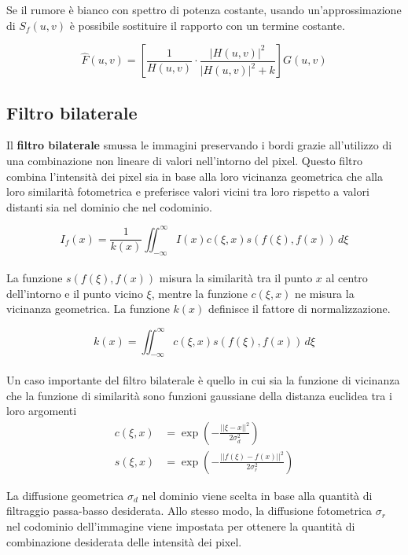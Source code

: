\documentclass[../main.tex]{subfiles}
\begin{document}
	Se il rumore è bianco con spettro di potenza costante, usando un'approssimazione di $S_f(u,v)$ è possibile sostituire il rapporto con un termine costante.
	
	\begin{equation}
		\hat{F}(u,v)= \left[\frac{1}{H(u,v)} \cdot \frac{\left|H(u,v)\right|^2}{\left|H(u,v)\right|^2+k}\right] G(u,v)
	\end{equation}
	
	\subsection{Filtro bilaterale}
	
	Il \textbf{filtro bilaterale} smussa le immagini preservando i bordi grazie all'utilizzo di una combinazione non lineare di valori nell'intorno del pixel. Questo filtro combina l'intensità dei pixel sia in base alla loro vicinanza geometrica che alla loro similarità fotometrica e preferisce valori vicini tra loro rispetto a valori distanti sia nel dominio che nel codominio\cite{tomasi_1998}.
	
	\begin{equation}
		I_f(x) = \frac{1}{k(x)}\iint_{-\infty}^{\infty}I(x)c(\xi,x)s(f(\xi),f(x))\,d\xi
	\end{equation}
	\\[-10pt]
	La funzione $s(f(\xi),f(x))$ misura la similarità tra il punto $x$ al centro dell'intorno e il punto vicino $\xi$, mentre la funzione $c(\xi,x)$ ne misura la vicinanza geometrica. La funzione $k(x)$ definisce il fattore di normalizzazione.
	
	\begin{equation}
		k(x) = \iint_{-\infty}^{\infty}c(\xi,x)s(f(\xi),f(x))\,d\xi
	\end{equation}
	\\[-10pt]
	Un caso importante del filtro bilaterale è quello in cui sia la funzione di vicinanza che la funzione di similarità sono funzioni gaussiane della distanza euclidea tra i loro argomenti
	\begin{align}
		c(\xi,x) &= \exp\left(-\frac{||\xi-x||^2}{2\sigma^2_d}\right)\\
		s(\xi,x) &= \exp\left(-\frac{||f(\xi)-f(x)||^2}{2\sigma^2_r}\right)
	\end{align}
	
	La diffusione geometrica $\sigma_d$ nel dominio viene scelta in base alla quantità di filtraggio passa-basso desiderata. Allo stesso modo, la diffusione fotometrica $\sigma_r$ nel codominio dell'immagine viene impostata per ottenere la quantità di combinazione desiderata delle intensità dei pixel.
	
\end{document}
